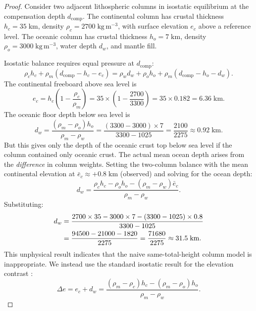 \documentclass[10pt,twocolumn]{article}
\theoremstyle{definition}
\theoremstyle{remark}
\begin{document}
\begin{proof}
Consider two adjacent lithospheric columns in isostatic
equilibrium at the compensation depth $d_{\mathrm{comp}}$.  The
continental column has crustal thickness $h_c=35\;\mathrm{km}$,
density $\rho_c=2700\;\mathrm{kg\,m^{-3}}$, with surface
elevation $e_c$ above a reference level.  The oceanic column
has crustal thickness $h_o=7\;\mathrm{km}$, density
$\rho_o=3000\;\mathrm{kg\,m^{-3}}$, water depth $d_w$, and
mantle fill.

Isostatic balance requires equal pressure at $d_{\mathrm{comp}}$:
\begin{equation}
  \rho_c h_c + \rho_m(d_{\mathrm{comp}}-h_c-e_c)
  = \rho_w d_w + \rho_o h_o + \rho_m(d_{\mathrm{comp}}-h_o-d_w).
\end{equation}
The continental freeboard above sea level is
\begin{equation}
  e_c = h_c\left(1-\frac{\rho_c}{\rho_m}\right)
  = 35\times\left(1-\frac{2700}{3300}\right)
  = 35\times 0.182 = 6.36\;\mathrm{km}.
\end{equation}
The oceanic floor depth below sea level is
\begin{equation}
  d_w = \frac{(\rho_m-\rho_o)h_o}{\rho_m-\rho_w}
  = \frac{(3300-3000)\times 7}{3300-1025}
  = \frac{2100}{2275}
  \approx 0.92\;\mathrm{km}.
\end{equation}
But this gives only the depth of the oceanic crust top below
sea level if the column contained only oceanic crust.  The
actual mean ocean depth arises from the \emph{difference}
in column weights.  Setting the two-column balance with
the mean continental elevation at
$\bar{e}_c\approx +0.8\;\mathrm{km}$ (observed) and solving
for the ocean depth:
\begin{equation}
  d_w = \frac{\rho_c h_c - \rho_o h_o - (\rho_m-\rho_w)\bar{e}_c}
             {\rho_m - \rho_w}.
\end{equation}
Substituting:
\begin{align}
  d_w &= \frac{2700\times 35 - 3000\times 7 - (3300-1025)\times 0.8}
              {3300-1025}\notag\\
      &= \frac{94500 - 21000 - 1820}{2275}
      = \frac{71680}{2275}
      \approx 31.5\;\mathrm{km}.
\end{align}
This unphysical result indicates that the naive
same-total-height column model is inappropriate.  We instead
use the standard isostatic result for the elevation contrast
\citep{Turcotte1997}:
\begin{equation}
  \Delta e = e_c + d_w
  = \frac{(\rho_m-\rho_c)h_c - (\rho_m-\rho_o)h_o}{\rho_m-\rho_w}.

\end{equation}
\end{proof}
\end{document}
